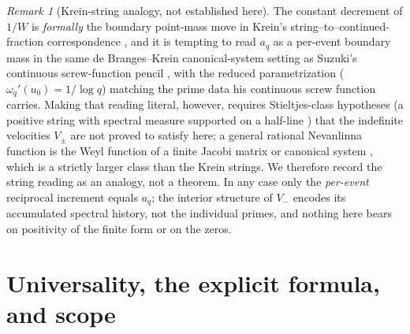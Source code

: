 \documentclass[11pt]{article}
\theoremstyle{plain}
\theoremstyle{definition}
\theoremstyle{remark}
\newtheorem{remark}[theorem]{Remark}
\begin{document}
\begin{remark}[Krein-string analogy, not established here]
The constant decrement of $1/W$ is \emph{formally} the boundary point-mass move
in Krein's string--to--continued-fraction correspondence
\cite{KacKrein1974string}, and it is tempting to
read $a_q$ as a per-event boundary mass in the same de Branges--Krein
canonical-system setting as Suzuki's continuous screw-function pencil
\cite{Suzuki2026}, with the reduced parametrization ($\omega_q'(u_0)=1/\log q$)
matching the prime data his continuous screw function carries. Making that
reading literal, however, requires Stieltjes-class hypotheses (a positive
string with spectral measure supported on a half-line
\cite{KacKrein1974string}) that the indefinite
velocities $V_\pm$ are not proved to satisfy here; a general rational Nevanlinna
function is the Weyl function of a finite Jacobi matrix or canonical system
\cite{GesztesySimon1997,KacKrein1974R},
which is a strictly larger class than the Krein strings. We therefore record
the string reading as an analogy, not a theorem. In any case only the
\emph{per-event} reciprocal increment equals $a_q$; the interior structure of
$V_-$ encodes its accumulated spectral history, not the individual primes, and
nothing here bears on positivity of the finite form or on the zeros.
\end{remark}

\section{Universality, the explicit formula, and scope}\label{sec:scope}
\end{document}
